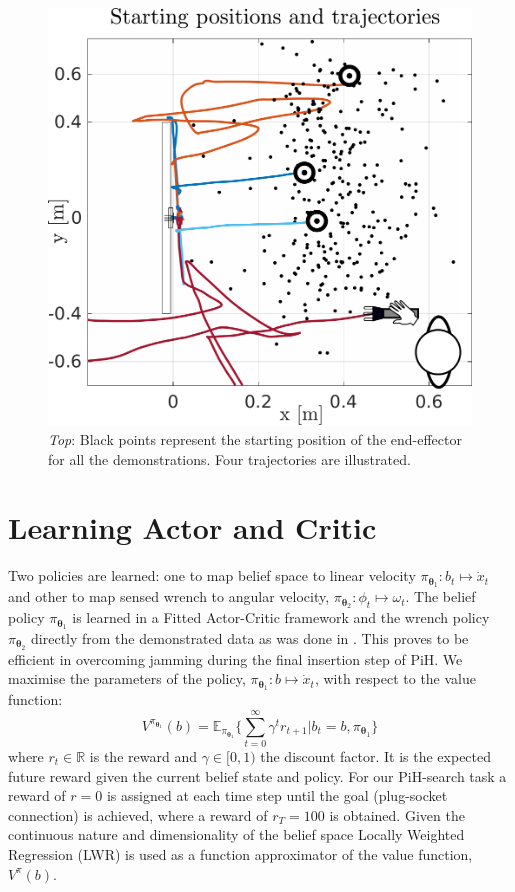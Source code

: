 \documentclass[final,5p,times,twocolumn]{elsarticle}
\newcommand{\Param}{\boldsymbol{\theta}}
\begin{document}
\begin{figure}
 \centering
   \includegraphics[width=0.9\linewidth]{./Figure/example_trajectories.pdf}
   \caption{\textit{Top}: Black points represent the starting position of the end-effector
   for all the demonstrations. Four trajectories are illustrated.}
  \label{fig:experiment_setup_data}
\end{figure}

\section{Learning Actor and Critic}\label{sec:learning-value-actor}

Two policies are learned: one to map belief space 
to linear velocity $\pi_{\Param_1} : b_t \mapsto \dot{x}_t$ and other to map sensed wrench to angular 
velocity, $ \pi_{\Param_2} : \phi_t \mapsto \omega_t$. The belief policy $\pi_{\Param_1}$ is learned in a Fitted Actor-Critic framework 
and the wrench policy $\pi_{\Param_2}$ directly from the demonstrated data as was done 
in \cite[Chap. 5]{Kronander2015}. This proves to be efficient in overcoming jamming during the final insertion step of PiH. 
We maximise the parameters of the policy, $\pi_{\Param_1}: b \mapsto \dot{x}_t$, 
with respect to the value function:
\begin{equation}\label{eq:value_function}
  V^{\pi_{\Param_1}}(b) = \mathbb{E}_{\pi_{\Param_1}}\Bigg\{ \sum_{t=0}^{\infty} \gamma^{t} r_{t+1} | b_t=b,\pi_{\Param_1}\Bigg\}
\end{equation}
where $r_t \in \mathbb{R}$ is the reward and $\gamma \in [0,1)$ the discount factor. It is the expected future reward given the current 
belief state and policy. For our PiH-search task a reward of ${r=0}$ is assigned at each time step until the goal
(plug-socket connection) is achieved, where a reward of $r_{T}=100$ is obtained. Given the continuous nature and 
dimensionality of the belief space Locally Weighted Regression \cite{Atkeson97locallyweighted} (LWR) is used as a function 
approximator of the value function, $V^{\pi}(b)$.
\end{document}

